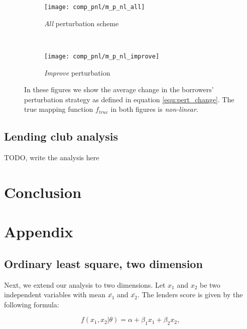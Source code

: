 \documentclass[12pt]{article} %
\begin{document}
\begin{figure*}[ht!]
    \centering
    \begin{subfigure}{0.5\textwidth}
        \centering
        \texttt{[image: comp\_pnl/m\_p\_nl\_all]}
        \caption{\textit{All} perturbation scheme}
        \label{fig:mp_nl_cross_algo_all}
    \end{subfigure}%
    ~ 
    \begin{subfigure}{0.5\textwidth}
        \centering
        \texttt{[image: comp\_pnl/m\_p\_nl\_improve]}
            \caption{\textit{Improve} perturbation}
        \label{fig:mp_nl_cross_algo_improve}
    \end{subfigure}
    \caption{
In these figures we show the average change in the borrowers' perturbation strategy as defined in equation \ref{equ:pert_change}. The true mapping function $f_{true}$ in both figures is \textit{non-linear}. }
\end{figure*}



\subsection{Lending club analysis}
\label{sec:result_real_data}
TODO, write the analysis here 

\section{Conclusion}
\label{sec:Conclusion}




\clearpage
\section{Appendix}

\subsection{Ordinary least square, two dimension}
\label{appendix:ols_2_dim}
Next, we extend our analysis to two dimensions. Let $x_1$ and $x_2$ be two independent variables with mean $\bar{x_1}$ and $\bar{x_2}$. The lenders score is given by the following formula: 

\begin{equation}
f\left(x_{1}, x_{2} | \theta\right)=\alpha+\beta_1 x_{1}+\beta_2 x_{2},
\end{equation}
\end{document}
